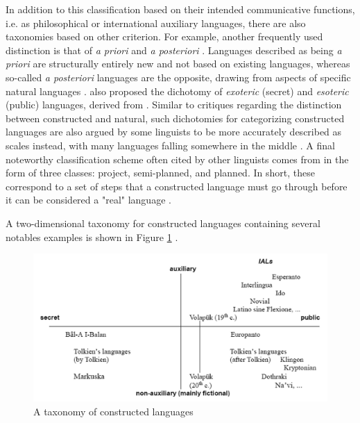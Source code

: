 \documentclass[12pt,a4paper]{article}
\numberwithin{figure}{section}
\numberwithin{table}{section}
\numberwithin{definition}{section}
\begin{document}
In addition to this classification based on their intended communicative functions, i.e. as philosophical or international auxiliary languages, there are also taxonomies based on other criterion. For example, another frequently used distinction is that of \textit{a priori} and \textit{a posteriori} \parencite{Schreyer2021article,Gobbo2008article,Schubert1989inbook,Schubert2001book,Novikov2022article,Adelman2014article,Tonkin2015article}. Languages described as being \textit{a priori} are structurally entirely new \parencite{Tonkin2015article} and not based on existing languages, whereas so-called \textit{a posteriori} languages are the opposite, drawing from aspects of specific natural languages \parencite{Schreyer2021article}. \textcite{Gobbo2008article} also proposed the dichotomy of \textit{exoteric} (secret) and \textit{esoteric} (public) languages, derived from \textcite{Bausani1974book}. Similar to critiques regarding the distinction between constructed and natural, such dichotomies for categorizing constructed languages are also argued by some linguists to be more accurately described as scales instead, with many languages falling somewhere in the middle \parencite{Novikov2022article}. A final noteworthy classification scheme often cited by other linguists comes from \textcite{Blanke1989book} in the form of three classes: project, semi-planned, and planned. In short, these correspond to a set of steps that a constructed language must go through before it can be considered a "real" language \parencite{Schubert2001book}. 

A two-dimensional taxonomy for constructed languages containing several notables examples is shown in Figure \ref{fig:taxonomyplannedlanguages} \parencite{Gobbo2016article}.


\begin{figure}
  \centering
        \includegraphics[width=1.0\textwidth]{TaxonomyOfPlannedLanguages.png}
        \caption{A taxonomy of constructed languages \parencite{Gobbo2016article}}
        \label{fig:taxonomyplannedlanguages}
\end{figure}
\end{document}

